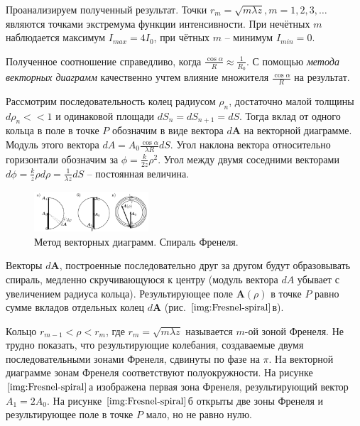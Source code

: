 Проанализируем полученный результат. Точки $r_m = \sqrt{m \lambda z}, m = 1, 2, 3, \dots$ являются точками экстремума функции интенсивности. При нечётных $m$ наблюдается максимум $I_{max} = 4I_0$, при чётных $m$ -- минимум $I_{min} = 0$.

Полученное соотношение справедливо, когда $\frac{\cos \alpha}{R} \approx \frac{1}{R_0}$. С помощью \textit{метода векторных диаграмм} качественно учтем влияние множителя $\frac{\cos \alpha}{R}$ на результат.

Рассмотрим последовательность колец радиусом $\rho_n$, достаточно малой толщины $d \rho_n << 1$ и одинаковой площади $dS_n = dS_{n+1} = dS$. Тогда вклад от одного кольца в поле в точке $P$ обозначим в виде вектора $d \boldsymbol{A}$ на векторной диаграмме. Модуль этого вектора $dA = A_0 \frac{\cos \alpha}{\lambda R} dS$. Угол наклона вектора относительно горизонтали обозначим за $\phi = \frac{k}{2z} \rho^2$. Угол между двумя соседними векторами $d \phi = \frac{k}{z} \rho d \rho = \frac{1}{\lambda z} dS$ -- постоянная величина. 

\begin{figure}
	\centering
	\includegraphics[width=0.38\textwidth]{../Изображения/Векторные диаграммы.png}
	\caption{Метод векторных диаграмм. Спираль Френеля.}
	\label{img:Fresnel-spiral}
\end{figure}

Векторы $d \boldsymbol{A}$, построенные последовательно друг за другом будут образовывать спираль, медленно скручивающуюся к центру (модуль вектора $dA$ убывает с увеличением радиуса кольца). Результирующее поле $\boldsymbol{A}(\rho)$ в точке $P$ равно сумме вкладов отдельных колец $d\boldsymbol{A}$ (рис. $\ref{img:Fresnel-spiral}$в).

Кольцо $r_{m - 1} < \rho < r_{m}$, где $r_m = \sqrt{m \lambda z}$ называется $m$-ой зоной Френеля. Не трудно показать, что результирующие колебания, создаваемые двумя последовательными зонами Френеля, сдвинуты по фазе на $\pi$. На векторной диаграмме зонам Френеля соответствуют полуокружности. На рисунке $\ref{img:Fresnel-spiral}$а изображена первая зона Френеля, результирующий вектор $A_1 = 2 A_0$. На рисунке $\ref{img:Fresnel-spiral}$б открыты две зоны Френеля и результирующее поле в точке $P$ мало, но не равно нулю.

